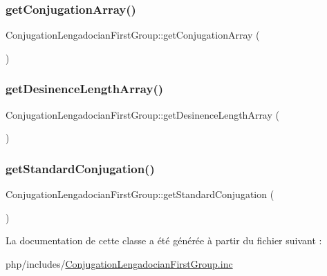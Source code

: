 \subsubsection{\texorpdfstring{get\+Conjugation\+Array()}{getConjugationArray()}}
{\footnotesize\ttfamily Conjugation\+Lengadocian\+First\+Group\+::get\+Conjugation\+Array (\begin{DoxyParamCaption}{ }\end{DoxyParamCaption})\hspace{0.3cm}{\ttfamily [protected]}}

\hypertarget{class_conjugation_lengadocian_first_group_a292ace5003eeb35711157918cde3c459}{}\label{class_conjugation_lengadocian_first_group_a292ace5003eeb35711157918cde3c459} 
\subsubsection{\texorpdfstring{get\+Desinence\+Length\+Array()}{getDesinenceLengthArray()}}
{\footnotesize\ttfamily Conjugation\+Lengadocian\+First\+Group\+::get\+Desinence\+Length\+Array (\begin{DoxyParamCaption}{ }\end{DoxyParamCaption})\hspace{0.3cm}{\ttfamily [protected]}}

\hypertarget{class_conjugation_lengadocian_first_group_a3728df26c35bff9d1f74dd0825b30873}{}\label{class_conjugation_lengadocian_first_group_a3728df26c35bff9d1f74dd0825b30873} 
\subsubsection{\texorpdfstring{get\+Standard\+Conjugation()}{getStandardConjugation()}}
{\footnotesize\ttfamily Conjugation\+Lengadocian\+First\+Group\+::get\+Standard\+Conjugation (\begin{DoxyParamCaption}{ }\end{DoxyParamCaption})\hspace{0.3cm}{\ttfamily [protected]}}



La documentation de cette classe a été générée à partir du fichier suivant \+:\begin{DoxyCompactItemize}
\item 
php/includes/\hyperlink{_conjugation_lengadocian_first_group_8inc}{Conjugation\+Lengadocian\+First\+Group.\+inc}\end{DoxyCompactItemize}
